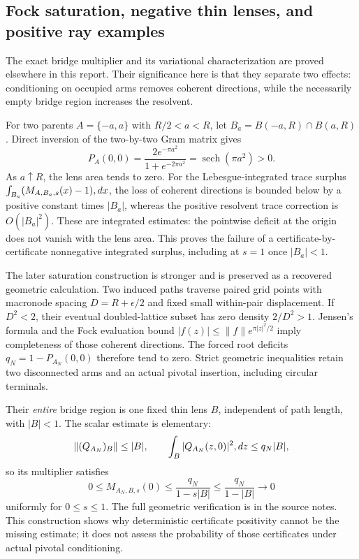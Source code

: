\documentclass[11pt,a4paper]{article}
\theoremstyle{definition}
\theoremstyle{remark}
\numberwithin{equation}{section}
\begin{document}
\subsection{Fock saturation, negative thin lenses, and positive ray examples}
\label{br:saturation}

The exact bridge multiplier and its variational characterization are
proved elsewhere in this report.  Their significance here is that they
separate two effects: conditioning on occupied arms removes coherent
directions, while the necessarily empty bridge region increases the
resolvent.

For two parents $A=\{-a,a\}$ with $R/2<a<R$, let
$B_a=B(-a,R)\cap B(a,R)$.  Direct inversion of the two-by-two Gram
matrix gives
\[
 P_A(0,0)=\frac{2e^{-\pi a^2}}{1+e^{-2\pi a^2}}
          =\operatorname{sech}(\pi a^2)>0.
\]
As $a\uparrow R$, the lens area tends to zero.  For the
Lebesgue-integrated trace surplus
$\int_{B_a}(M_{A,B_a,s}(x)-1)\\,dx$, the loss of coherent directions
is bounded below by a positive constant times $|B_a|$, whereas the
positive resolvent trace correction is $O(|B_a|^2)$.  These are
integrated estimates: the pointwise deficit at the origin does not
vanish with the lens area.  This proves the failure of a
certificate-by-certificate nonnegative integrated surplus, including
at $s=1$ once $|B_a|<1$.

The later saturation construction is stronger and is preserved as a
recovered geometric calculation.  Two induced paths traverse paired
grid points with macronode spacing
$D=R+\epsilon/2$ and fixed small within-pair displacement.  If $D^2<2$,
their eventual doubled-lattice subset has zero density $2/D^2>1$.
Jensen's formula and the Fock evaluation bound
$|f(z)|\leq\|f\|e^{\pi|z|^2/2}$ imply completeness of those coherent
directions.  The forced root deficits $q_N=1-P_{A_N}(0,0)$ therefore
tend to zero.  Strict geometric inequalities retain two disconnected
arms and an actual pivotal insertion, including circular terminals.

Their \emph{entire} bridge region is one fixed thin lens $B$, independent
of path length, with $|B|<1$.  The scalar estimate is elementary:
\[
 \|(Q_{A_N})_B\|\leq|B|,
 \qquad
 \int_B|Q_{A_N}(z,0)|^2\\,dz\leq q_N|B|,
\]
so its multiplier satisfies
\begin{equation}
 0\leq M_{A_N,B,s}(0)
 \leq\frac{q_N}{1-s|B|}
 \leq\frac{q_N}{1-|B|}\longrightarrow0
 \label{br:saturated-multiplier}
\end{equation}
uniformly for $0\leq s\leq1$.  The full geometric verification is in
the source notes.  This construction shows why deterministic certificate
positivity cannot be the missing estimate; it does not assess the
probability of those certificates under actual pivotal conditioning.
\end{document}

